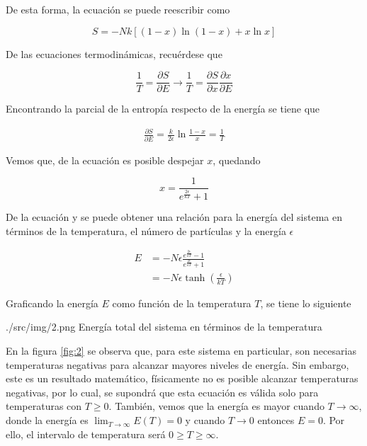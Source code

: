 De esta forma, la ecuación  se puede reescribir como 

\begin{equation}
    S = -Nk\left[(1-x)\ln{(1-x)} + x\ln{x}\right]
    \label{eq:entropia:2}
\end{equation}

De las ecuaciones termodinámicas, recuérdese que

\begin{equation}
    \frac{1}{T} = \frac{\partial S}{\partial E} \rightarrow \frac{1}{T} = \frac{\partial S}{\partial x} \frac{\partial x}{\partial E}
\end{equation}

Encontrando la parcial de la entropía respecto de la energía se tiene que 

\begin{equation}
    \begin{aligned}
        \frac{\partial S}{\partial E} = \frac{k}{2\epsilon}\ln{\frac{1-x}{x}} = \frac{1}{T}
        \label{eq:parcial:entropia}
    \end{aligned}
\end{equation}

Vemos que, de la ecuación  es posible despejar $x$, quedando

\begin{equation}
    x = \frac{1}{e^\frac{2\epsilon}{kT} + 1}
    \label{eq:fraccion:2}
\end{equation}

De la ecuación  y  se puede obtener una relación para la energía del sistema en términos de la temperatura, el número de partículas y la energía $\epsilon$

\begin{equation}
    \begin{aligned}
        E &= -N\epsilon\frac{e^\frac{2\epsilon}{kT}-1}{e^\frac{2\epsilon}{kT}+1} \\
        &= -N\epsilon\tanh{\left(\frac{\epsilon}{kT}\right)}
    \end{aligned}
    \label{eq:energia}
\end{equation}

Graficando la energía $E$ como función de la temperatura $T$, se tiene lo siguiente

\imagen
{./src/img/2.png}
{Energía total del sistema en términos de la temperatura}
{\label{fig:2}}

En la figura \ref{fig:2} se observa que, para este sistema en particular, son necesarias temperaturas negativas para alcanzar mayores niveles de energía. Sin embargo, este es un resultado matemático, físicamente no es posible alcanzar temperaturas negativas, por lo cual, se supondrá que esta ecuación es válida solo para temperaturas con $T \geq 0$. También, vemos que la energía es mayor cuando $T \rightarrow \infty$, donde la energía es $\lim_{T \to \infty} E\left(T\right) = 0$ y cuando $T \rightarrow 0$ entonces $E = 0$. Por ello, el intervalo de temperatura será $0 \geq T \geq \infty$.

